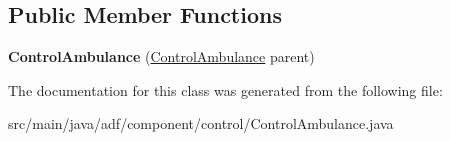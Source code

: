 \subsection*{Public Member Functions}
\begin{DoxyCompactItemize}
\item 
\hypertarget{classadf_1_1component_1_1control_1_1ControlAmbulance_ade5e6a6110e83443fbef51dec9d2723b}{}\label{classadf_1_1component_1_1control_1_1ControlAmbulance_ade5e6a6110e83443fbef51dec9d2723b} 
{\bfseries Control\+Ambulance} (\hyperlink{classadf_1_1component_1_1control_1_1ControlAmbulance}{Control\+Ambulance} parent)
\end{DoxyCompactItemize}


The documentation for this class was generated from the following file\+:\begin{DoxyCompactItemize}
\item 
src/main/java/adf/component/control/Control\+Ambulance.\+java\end{DoxyCompactItemize}
